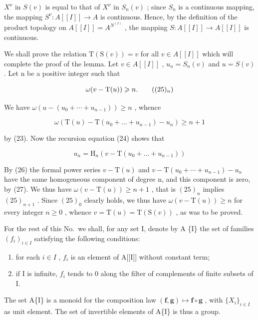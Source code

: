\(X^{\nu}\) in \(S(v)\) is equal to that of \(X^{\nu}\) in \(S_{n}(v)\) ; since \(S_{n}\) is a continuous mapping, the mapping \(S^{\nu}: A[[I]] \to A\) is continuous. Hence, by the definition of the product topology on \(A[[I]] = A^{N^{(I)}}\) , the mapping \(S: A[[I]] \to A[[I]]\) is continuous.

We shall prove the relation \(\mathrm{T}(\mathrm{S}(v)) = v\) for all \(v \in A[[I]]\) which will complete the proof of the lemma. Let \(v \in A[[I]]\) , \(u_n = S_n(v)\) and \(u = S(v)\) . Let n be a positive integer such that

\[
\omega (v - \mathrm{T} (u)) \geqslant n.\tag{$(25)_{n}$}
\]

We have \(\omega(u - (u_{0} + \cdots + u_{n-1})) \geqslant n\) , whence

\[
\omega (\mathrm{T} (u) - \mathrm{T} (u _ {0} + \dots + u _ {n - 1}) - u _ {n}) \geqslant n + 1\tag{26}
\]

by (23). Now the recursion equation (24) shows that

\[
u _ {n} = \mathrm{H} _ {n} (v - \mathrm{T} (u _ {0} + \dots + u _ {n - 1}))\tag{27}
\]

By (26) the formal power series \(v - \mathrm{T}(u)\) and \(v - \mathrm{T}(u_{0} + \cdots + u_{n-1}) - u_{n}\) have the same homogeneous component of degree n, and this component is zero, by (27). We thus have \(\omega(v - \mathrm{T}(u)) \geqslant n + 1\) , that is \((25)_{n}\) implies \((25)_{n+1}\) . Since \((25)_{0}\) clearly holds, we thus have \(\omega(v - \mathrm{T}(u)) \geqslant n\) for every integer \(n \geqslant 0\) , whence \(v = \mathrm{T}(u) = \mathrm{T}(\mathrm{S}(v))\) , as was to be proved.

For the rest of this No.~we shall, for any set I, denote by A \{I\} the set of families \((f_i)_{i\in I}\) satisfying the following conditions:

\begin{enumerate}
\def\labelenumi{(\roman{enumi})}
\item
  for each \(i \in I\) , \(f_i\) is an element of A{[}{[}I{]}{]} without constant term;
\item
  if I is infinite, \(f_{i}\) tends to 0 along the filter of complements of finite subsets of I.
\end{enumerate}

The set A\{I\} is a monoid for the composition law \((\mathbf{f},\mathbf{g})\mapsto\mathbf{f}\circ\mathbf{g}\) , with \(\{X_{i}\}_{i\in I}\) as unit element. The set of invertible elements of A\{I\} is thus a group.

